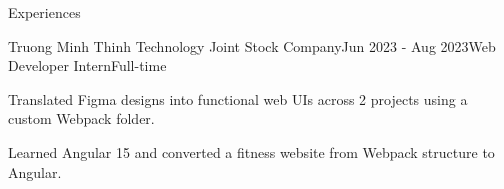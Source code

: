 \documentclass{resume} %
\begin{document}
\begin{rSection}{Experiences}

\begin{rSubsection}{Truong Minh Thinh Technology Joint Stock Company}{Jun 2023 - Aug 2023}{Web Developer Intern}{Full-time}
\item Translated Figma designs into functional web UIs across 2 projects using a custom Webpack folder.
\item Learned Angular 15 and converted a fitness website from Webpack structure to Angular.
\end{rSubsection}

\end{rSection}


\end{document}
